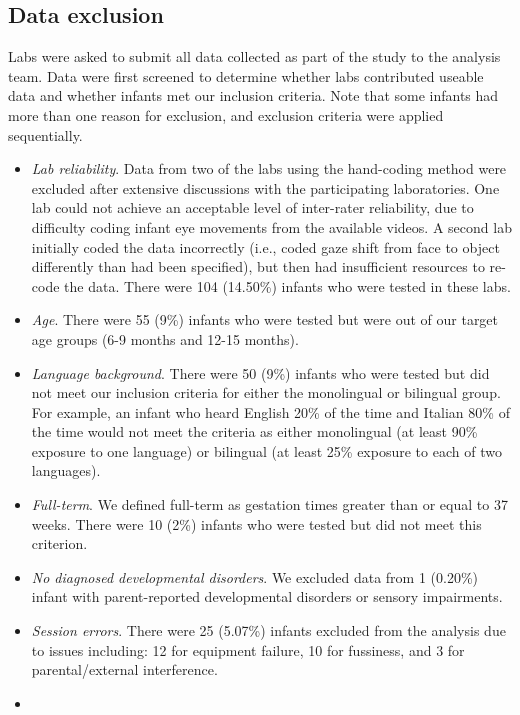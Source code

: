 \documentclass[,man,floatsintext]{apa6}
\begin{document}
\hypertarget{data-exclusion}{%
\subsection{Data exclusion}\label{data-exclusion}}

Labs were asked to submit all data collected as part of the study to the analysis team. Data were first screened to determine whether labs contributed useable data and whether infants met our inclusion criteria. Note that some infants had more than one reason for exclusion, and exclusion criteria were applied sequentially.

\begin{itemize}
\item
  \emph{Lab reliability}. Data from two of the labs using the hand-coding method were excluded after extensive discussions with the participating laboratories. One lab could not achieve an acceptable level of inter-rater reliability, due to difficulty coding infant eye movements from the available videos. A second lab initially coded the data incorrectly (i.e., coded gaze shift from face to object differently than had been specified), but then had insufficient resources to re-code the data. There were 104 (14.50\%) infants who were tested in these labs.
\item
  \emph{Age}. There were 55 (9\%) infants who were tested but were out of our target age groups (6-9 months and 12-15 months).
\item
  \emph{Language background}. There were 50 (9\%) infants who were tested but did not meet our inclusion criteria for either the monolingual or bilingual group. For example, an infant who heard English 20\% of the time and Italian 80\% of the time would not meet the criteria as either monolingual (at least 90\% exposure to one language) or bilingual (at least 25\% exposure to each of two languages).
\item
  \emph{Full-term}. We defined full-term as gestation times greater than or equal to 37 weeks. There were 10 (2\%) infants who were tested but did not meet this criterion.
\item
  \emph{No diagnosed developmental disorders}. We excluded data from 1 (0.20\%) infant with parent-reported developmental disorders or sensory impairments.
\item
  \emph{Session errors}. There were 25 (5.07\%) infants excluded from the analysis due to issues including: 12 for equipment failure, 10 for fussiness, and 3 for parental/external interference.
\item

\end{itemize}
\end{document}
